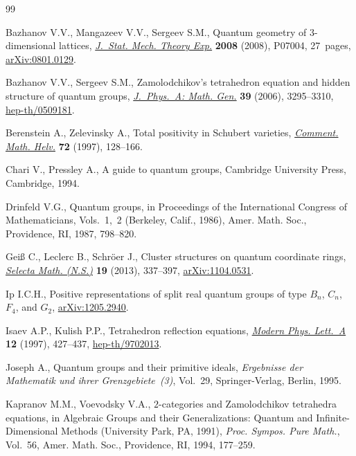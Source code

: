 \documentclass[pdftex]{sigma}
\begin{document}
\begin{thebibliography}{99}
\footnotesize\itemsep=0pt

Bazhanov V.V., Mangazeev V.V., Sergeev S.M., Quantum geometry of
  3-dimensional lattices, \href{http://dx.doi.org/10.1088/1742-5468/2008/07/P07004}{\textit{J.~Stat. Mech. Theory Exp.}} \textbf{2008}
  (2008), P07004, 27~pages, \href{http://arxiv.org/abs/0801.0129}{arXiv:0801.0129}.

Bazhanov V.V., Sergeev S.M., Zamolodchikov's tetrahedron equation and hidden
  structure of quantum groups, \href{http://dx.doi.org/10.1088/0305-4470/39/13/009}{\textit{J.~Phys.~A: Math. Gen.}} \textbf{39}
  (2006), 3295--3310, \href{http://arxiv.org/abs/hep-th/0509181}{hep-th/0509181}.

Berenstein A., Zelevinsky A., Total positivity in {S}chubert varieties,
  \href{http://dx.doi.org/10.1007/PL00000363}{\textit{Comment. Math. Helv.}} \textbf{72} (1997), 128--166.

Chari V., Pressley A., A guide to quantum groups, Cambridge University Press,
  Cambridge, 1994.

Drinfeld V.G., Quantum groups, in Proceedings of the {I}nternational {C}ongress
  of {M}athematicians, {V}ols.~1,~2 ({B}erkeley, {C}alif., 1986), Amer. Math.
  Soc., Providence, RI, 1987, 798--820.

Gei{\ss} C., Leclerc B., Schr\"oer J., Cluster structures on quantum coordinate
  rings, \href{http://dx.doi.org/10.1007/s00029-012-0099-x}{\textit{Selecta Math. (N.S.)}} \textbf{19} (2013), 337--397,
  \href{http://arxiv.org/abs/1104.0531}{arXiv:1104.0531}.

Ip I.C.H., Positive representations of split real quantum groups of type $B_n$,
  $C_n$, $F_4$, and $G_2$, \href{http://arxiv.org/abs/1205.2940}{arXiv:1205.2940}.

Isaev A.P., Kulish P.P., Tetrahedron ref\/lection equations, \href{http://dx.doi.org/10.1142/S0217732397000443}{\textit{Modern Phys.
  Lett.~A}} \textbf{12} (1997), 427--437, \mbox{\href{http://arxiv.org/abs/hep-th/9702013}{hep-th/9702013}}.

Joseph A., Quantum groups and their primitive ideals, \textit{Ergebnisse der
  Mathematik und ihrer Grenzge\-biete~(3)}, Vol.~29, Springer-Verlag, Berlin,
  1995.

Kapranov M.M., Voevodsky V.A., {$2$}-categories and {Z}amolodchikov tetrahedra
  equations, in Algebraic Groups and their Generalizations: Quantum and
  Inf\/inite-Dimensional Methods ({U}niversity {P}ark, {PA}, 1991), \textit{Proc.
  Sympos. Pure Math.}, Vol.~56, Amer. Math. Soc., Providence, RI, 1994,
  177--259.


\end{thebibliography}
\end{document}
